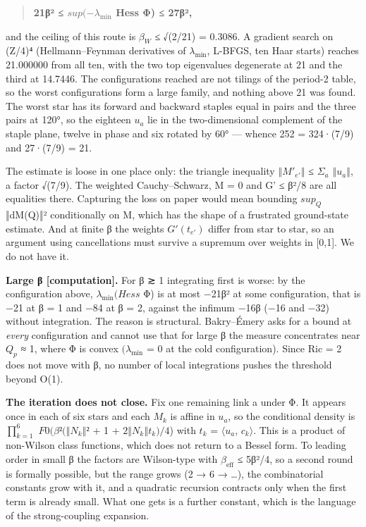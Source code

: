 \documentclass[11pt,a4paper]{article}
\theoremstyle{named}
\begin{document}
\begin{quote}
\textbf{21β² ≤ $sup(−λ_{\min}$ Hess Φ) ≤ 27β²,}
\end{quote}
and the ceiling of this route is $β_W$ ≤ √(2/21) = 0.3086. A gradient search on (Z/4)⁴ (Hellmann–Feynman derivatives of $λ_{\min}$, L-BFGS, ten Haar starts) reaches 21.000000 from all ten, with the two top eigenvalues degenerate at 21 and the third at 14.7446. The configurations reached are not tilings of the period-2 table, so the worst configurations form a large family, and nothing above 21 was found. The worst star has its forward and backward staples equal in pairs and the three pairs at 120°, so the eighteen $u_a$ lie in the two-dimensional complement of the staple plane, twelve in phase and six rotated by 60° — whence 252 = 324·(7/9) and 27·(7/9) = 21.

The estimate is loose in one place only: the triangle inequality $‖M'_{e'}‖$ ≤ $Σ_a$ $‖u_a‖$, a factor √(7/9). The weighted Cauchy–Schwarz, M = 0 and G' ≤ β²/8 are all equalities there. Capturing the loss on paper would mean bounding $sup_Q$ ‖dM(Q)‖² conditionally on M, which has the shape of a frustrated ground-state estimate. And at finite β the weights $G'(t_{e'})$ differ from star to star, so an argument using cancellations must survive a supremum over weights in [0,1]. We do not have it.

\textbf{Large β [computation].} For β ≳ 1 integrating first is worse: by the configuration above, $λ_{\min}(Hess$ Φ) is at most −21β² at some configuration, that is −21 at β = 1 and −84 at β = 2, against the infimum −16β (−16 and −32) without integration. The reason is structural. Bakry–Émery asks for a bound at \textit{every} configuration and cannot use that for large β the measure concentrates near $Q_p$ ≈ 1, where Φ is convex $(λ_{\min}$ = 0 at the cold configuration). Since Ric = 2 does not move with β, no number of local integrations pushes the threshold beyond O(1).

\textbf{The iteration does not close.} Fix one remaining link a under Φ. It appears once in each of six stars and each $M_k$ is affine in $u_a$, so the conditional density is $∏_{k=1}^{6}$ $F0(β²(‖N_k‖²$ + 1 + $2‖N_k‖t_k)/4$) with $t_k$ = $⟨u_a$, $c_k⟩$. This is a product of non-Wilson class functions, which does not return to a Bessel form. To leading order in small β the factors are Wilson-type with $β_{\mathrm{eff}}$ ≤ 5β²/4, so a second round is formally possible, but the range grows (2 → 6 → …), the combinatorial constants grow with it, and a quadratic recursion contracts only when the first term is already small. What one gets is a further constant, which is the language of the strong-coupling expansion.
\end{document}
